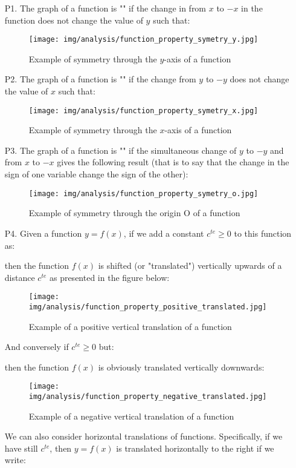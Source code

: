 	\begin{enumerate}
		\item[P1.] The graph of a function is "" if the change in from $x$ to  $-x$ in the function does not change the value of $y$ such that:
		\begin{figure}[H]
		\centering
		\texttt{[image: img/analysis/function\_property\_symetry\_y.jpg]}
		\caption{Example of symmetry through the $y$-axis of a function}
		\end{figure}
		
		\item[P2.] The graph of a function is "" if the change from $y$ to $-y$ does not change the value of $x$ such that:
		\begin{figure}[H]
		\centering
		\texttt{[image: img/analysis/function\_property\_symetry\_x.jpg]}
		\caption{Example of symmetry through the $x$-axis of a function}
		\end{figure}
		
		\item[P3.] The graph of a function is "" if the simultaneous change of $y$ to $-y$ and from $x$ to $-x$ gives the following result (that is to say that the change in the sign of one variable change the sign of the other):
		\begin{figure}[H]
		\centering
		\texttt{[image: img/analysis/function\_property\_symetry\_o.jpg]}
		\caption{Example of symmetry through the origin $\text{O}$ of a function}
		\end{figure}
		
		\item[P4.] Given a function $y=f(x)$, if we add a constant $c^{te} \geq 0$ to this function as:
		
		then the function $f(x)$ is shifted (or "translated") vertically upwards of a distance $c^{te}$ as presented in the figure below:
		\begin{figure}[H]
		\centering
		\texttt{[image: img/analysis/function\_property\_positive\_translated.jpg]}
		\caption{Example of a positive vertical translation of a function}
		\end{figure}
		And conversely if $c^{te} \geq 0$ but:
		
		then the function $f(x)$  is obviously translated vertically downwards:
		\begin{figure}[H]
		\centering
		\texttt{[image: img/analysis/function\_property\_negative\_translated.jpg]}
		\caption{Example of a negative vertical translation of a function}
		\end{figure}
		We can also consider horizontal translations of functions. Specifically, if we have still $c^{te}$, then $y=f(x)$ is translated horizontally to the right if we write:
		

\end{enumerate}
